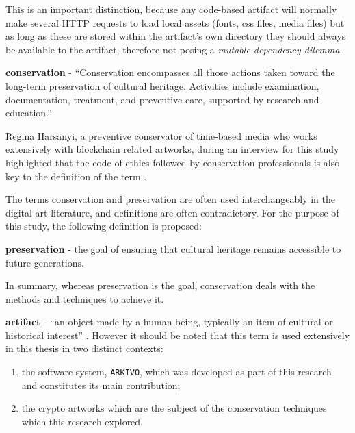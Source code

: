 \vspace{0.5cm}

This is an important distinction, because any code-based artifact will normally make several HTTP requests to load local assets (fonts, css files, media files) but as long as these are stored within the artifact's own directory they should always be available to the artifact, therefore not posing a \emph{mutable dependency dilemma}.

\vspace{0.5cm}

\textbf{conservation} - ``Conservation encompasses all those actions taken toward the long-term preservation of cultural heritage. Activities include examination, documentation, treatment, and preventive care, supported by research and education.''  \cite{WhatConservation}

\vspace{0.5cm}

Regina Harsanyi, a preventive conservator of time-based media who works extensively with blockchain related artworks, during an interview for this study highlighted that the code of ethics followed by conservation professionals is also key to the definition of the term \cite{americaninstitutefrorconservationCodeEthicsGuidelines}.

\vspace{0.5cm}

The terms conservation and preservation are often used interchangeably in the digital art literature, and definitions are often contradictory. For the purpose of this study, the following definition is proposed:

\vspace{0.5cm}
\textbf{preservation} - the goal of ensuring that cultural heritage remains accessible to future generations.

\vspace{0.5cm}

In summary, whereas preservation is the goal, conservation deals with the methods and techniques to achieve it.

\vspace{0.5cm}

\textbf{artifact} - ``an object made by a human being, typically an item of cultural or historical interest'' \cite{OxfordAdvancedLearner}. However it should be noted that this term is used extensively in this thesis in two distinct contexts:

\begin{enumerate}
    \item the software system, \texttt{ARKIVO}, which was developed as part of this research and constitutes its main contribution;
    \item the crypto artworks which are the subject of the conservation techniques which this research explored.
\end{enumerate}

